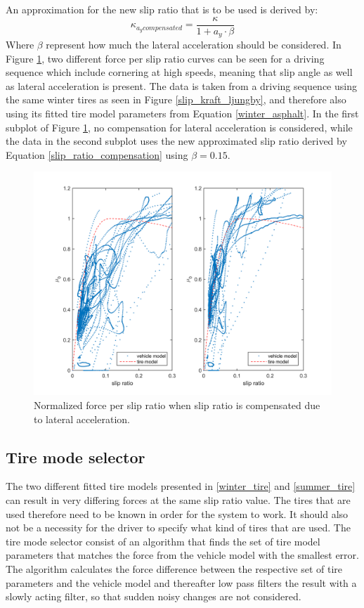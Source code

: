 An approximation for the new slip ratio that is to be used is derived by:
\begin{equation}
\label{slip_ratio_compensation}
\kappa_{a_{y} compensated} = \dfrac{\kappa}{1 + a_{y}\cdot \beta}
\end{equation}
Where $ \beta $ represent how much the lateral acceleration should be considered. In Figure \ref{latacc_compensated}, two different force per slip ratio curves can be seen for a driving sequence which include cornering at high speeds, meaning that slip angle as well as lateral acceleration is present. The data is taken from a driving sequence using the same winter tires as seen in Figure \ref{slip_kraft_ljungby}, and therefore also using its fitted tire model parameters from Equation \ref{winter_asphalt}. In the first subplot of Figure \ref{latacc_compensated}, no compensation for lateral acceleration is considered, while the data in the second subplot uses the new approximated slip ratio derived by Equation \ref{slip_ratio_compensation} using $ \beta = 0.15 $. 
\begin{figure}[h]
	\centering
	\includegraphics[width=1.0\textwidth]{Pictures/latacc_compensated}
	\caption {Normalized force per slip ratio when slip ratio is compensated due to lateral acceleration.}
	\label{latacc_compensated}
\end{figure}

\subsection{Tire mode selector}

The two different fitted tire models presented in \ref{winter_tire} and \ref{summer_tire} can result in very differing forces at the same slip ratio value. The tires that are used therefore need to be known in order for the system to work. It should also not be a necessity for the driver to specify what kind of tires that are used. The tire mode selector consist of an algorithm that finds the set of tire model parameters that matches the force from the vehicle model with the smallest error. The algorithm calculates the force difference between the respective set of tire parameters and the vehicle model and thereafter low pass filters the result with a slowly acting filter, so that sudden noisy changes are not considered. 

